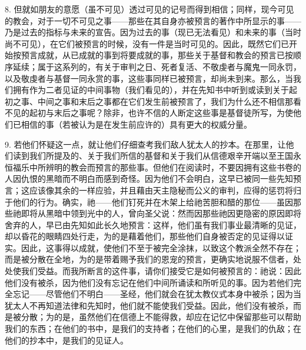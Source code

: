 8. 但就如朋友的意愿（虽不可见）透过可见的记号而得到相信；同样，现今可见的教会，对于一切不可见之事——那些在其自身亦被预言的著作中所显示的事——乃是过去的指标与未来的宣告。因为过去的事（现已无法看见）和未来的事（当时尚不可见），在它们被预言的时候，没有一件是当时可见的。因此，既然它们已开始按预言成就，从已成就的事到将要成就的事，那些关于基督和教会的预言已按顺序延续；属于这系列的，有关于审判之日、死者复活、不敬虔者与魔鬼一同永罚，以及敬虔者与基督一同永赏的事，这些事同样已被预言，却尚未到来。那么，当我们拥有作为二者见证的中间事物（我们看见的），并在先知书中听到或读到关于起初之事、中间之事和末后之事都在它们发生前被预言了，我们为什么还不相信那看不见的起初与末后之事呢？除非，也许不信的人断定这些事是基督徒所写，为使他们已相信的事（若被认为是在发生前应许的）具有更大的权威分量。\par

9. 若他们怀疑这一点，就让他们仔细查考我们敌人犹太人的抄本。在那里，让他们读到我们所提及的、关于我们所信的基督和关于我们从信德艰辛开端以至王国永恒福乐中所辨明的教会而预言的那些事。但他们在阅读时，不要因拥有这些书卷的人因仇恨的黑暗而不明白而感到奇怪。因为他们不会明白，这早已被同一些先知预言；这应该像其余的一样应验，并且藉由天主隐秘而公义的审判，应得的惩罚将归于他们的行为。确实，祂——他们钉死并在木架上给祂苦胆和醋的那位——虽因那些祂即将从黑暗中领到光中的人，曾向圣父说：然而因那些祂因更隐密的原因即将舍弃的人，早已由先知如此长久地预言：这样，他们虽有我们事业最清晰的见证，却以昏花的眼睛四处行走，为的是藉着他们，那些他们自身被否定的见证得以证实。因此，这事得以成就，使他们不至于被完全涂抹，以致这个教派全然不存在；而是被分散在全地，为的是带着赐予我们的恩宠的预言，更确实地说服不信者，处处使我们受益。而我所断言的这件事，请你们接受它是如何被预言的：祂说：因此他们没有被杀，因为他们没有忘记在他们中间所诵读和所听见的事。因为若他们完全忘记——尽管他们不明白——圣经，他们就会在犹太教仪式本身中被杀；因为当犹太人不再知道法律和先知时，他们就不能使我们受益。因此，他们没有被杀，而是被分散；为的是，虽然他们在信德上不能得救，却应在记忆中保留那些可以帮助我们的东西；在他们的书中，是我们的支持者；在他们的心里，是我们的仇敌；在他们的抄本中，是我们的见证人。\par

